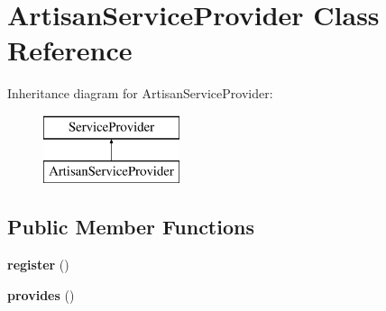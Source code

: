 \section{Artisan\+Service\+Provider Class Reference}
\label{class_illuminate_1_1_foundation_1_1_providers_1_1_artisan_service_provider}
Inheritance diagram for Artisan\+Service\+Provider\+:\begin{figure}[H]
\begin{center}
\leavevmode
\includegraphics[height=2.000000cm]{class_illuminate_1_1_foundation_1_1_providers_1_1_artisan_service_provider}
\end{center}
\end{figure}
\subsection*{Public Member Functions}
\begin{DoxyCompactItemize}
\item 
{\bf register} ()
\item 
{\bf provides} ()
\end{DoxyCompactItemize}
